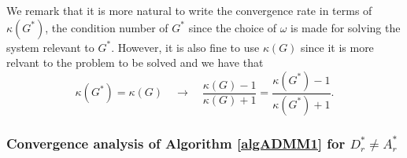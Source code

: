 \begin{remark}
We remark that it is more natural to write the convergence rate in terms of $\kappa(G^*)$, the condition number of $G^*$ since the choice of $\omega$ is made for solving the system relevant to $G^*$. However, it is also fine to use $\kappa(G)$ since it is more relvant to the problem to be solved and we have that
\begin{equation}
\kappa(G^*) = \kappa(G) \quad \rightarrow \quad 
\frac{\kappa(G) - 1}{\kappa(G) + 1} = \frac{\kappa(G^*) - 1}{\kappa(G^*) + 1}. 
\end{equation}
\end{remark} 

\subsubsection{Convergence analysis of Algorithm \ref{algADMM1} for $D_r^* \neq A_r^*$}\label{gdn} 

